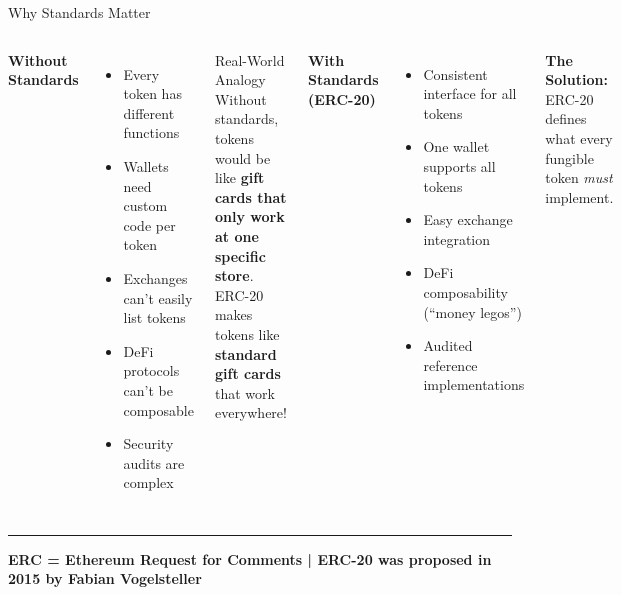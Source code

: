 \documentclass[8pt,aspectratio=169]{beamer}
\newcommand{\bottomnote}[1]{%
\vfill
\vspace{-2mm}
\textcolor{mllavender2}{\rule{\textwidth}{0.4pt}}
\vspace{1mm}
\footnotesize
\textbf{#1}
}
\begin{document}
\begin{frame}[t]{Why Standards Matter}
\begin{columns}[T]
\textbf{Without Standards}

\begin{itemize}
\item[\textcolor{mlred}{$\times$}] Every token has different functions
\item[\textcolor{mlred}{$\times$}] Wallets need custom code per token
\item[\textcolor{mlred}{$\times$}] Exchanges can't easily list tokens
\item[\textcolor{mlred}{$\times$}] DeFi protocols can't be composable
\item[\textcolor{mlred}{$\times$}] Security audits are complex
\end{itemize}

\vspace{0.3em}
\begin{block}{Real-World Analogy}
Without standards, tokens would be like \textbf{gift cards that only work at one specific store}. ERC-20 makes tokens like \textbf{standard gift cards} that work everywhere!
\end{block}

\textbf{With Standards (ERC-20)}

\begin{itemize}
\item[\textcolor{mlgreen}{$\checkmark$}] Consistent interface for all tokens
\item[\textcolor{mlgreen}{$\checkmark$}] One wallet supports all tokens
\item[\textcolor{mlgreen}{$\checkmark$}] Easy exchange integration
\item[\textcolor{mlgreen}{$\checkmark$}] DeFi composability (``money legos'')
\item[\textcolor{mlgreen}{$\checkmark$}] Audited reference implementations
\end{itemize}

\vspace{0.5em}
\textbf{The Solution:}\\
ERC-20 defines what every fungible token \textit{must} implement.
\end{columns}

\bottomnote{ERC = Ethereum Request for Comments | ERC-20 was proposed in 2015 by Fabian Vogelsteller}
\end{frame}
\end{document}
